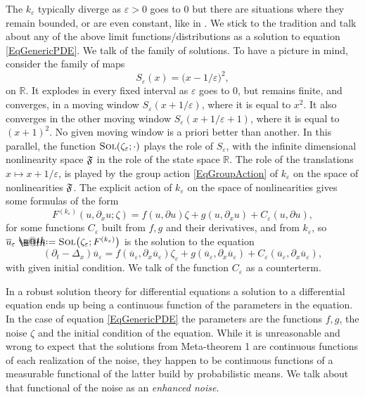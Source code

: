 \documentclass[10pt, reqno]{amsart}
\makeatletter
\numberwithin{subsection}{section}
\numberwithin{subsubsection}{subsection}
\numberwithin{equation}{section} %
\theoremstyle{mystyle}
\theoremstyle{mystyle2}
\theoremstyle{mystyle3}
\newcommand{\ssk}{\smallskip}
\renewcommand{\epsilon}{\varepsilon}
\newcommand\bbR{\mathbb{R}}
\newcommand*{\defeq}{\mathrel{\rlap{%
                     \raisebox{0.3ex}{$\m@th\cdot$}}%
                     \raisebox{-0.3ex}{$\m@th\cdot$}}%
                     =}
\makeatother
\begin{document}
The $k_\epsilon$ typically diverge as $\epsilon>0$ goes to $0$ but there are situations where they remain bounded, or are even constant, like in \cite{BrunedGabrielHairerZambotti}. We stick to the tradition and talk about any of the above limit functions/distributions as a solution to equation \eqref{EqGenericPDE}. We talk of 
the family of solutions. To have a picture in mind, consider the family of maps 
\begin{equation} \label{EqDefnSEpsilon}
S_\epsilon(x) = \big(x-1/\epsilon\big)^2,
\end{equation}
on $\bbR$. It explodes in every fixed interval as $\epsilon$ goes to $0$, 
but remains finite, and converges, in a moving window $S_\epsilon(x+1/\epsilon)$, where it is equal to $x^2$. It also converges in the other moving window $S_\epsilon(x+1/\epsilon+1)$, where it is equal to $(x+1)^2$. No 
given moving window is a priori better than another. In this parallel, the function $\textsc{Sol}(\zeta_\epsilon ; \cdot)$ plays the role of $S_\epsilon$, with the infinite dimensional nonlinearity space $\frak{F}$ in the role of the state space $\bbR$. The role of the translations $x\mapsto 
x+1/\epsilon$, is played by the group action \eqref{EqGroupAction} of $k_\epsilon$ on the space of nonlinearities $\frak{F}$. The explicit action of $k_\epsilon$ on the space of nonlinearities gives some formulas of the form 
$$
F^{(k_\epsilon)}(u,\partial_x u ; \zeta) = f(u,\partial u)\zeta + g(u,\partial_x u) + C_\epsilon(u,\partial u),
$$
for some functions $C_\epsilon$ built from $f,g$ and their derivatives, and from $k_\varepsilon$, so $\overline{u}_\epsilon\defeq\textsc{Sol}\big(\zeta_\epsilon; F^{(k_\epsilon)}\big)$ is the solution to the equation 
\begin{equation} \label{EqrenormalizedPDE}
(\partial_t-\Delta_x)\overline{u}_\epsilon = f(\overline{u}_\epsilon,\partial_x \overline{u}_\epsilon)\zeta_\epsilon + g(\overline{u}_\epsilon,\partial_x \overline{u}_\epsilon) + C_\epsilon(\overline{u}_\epsilon,\partial_x \overline{u}_\epsilon),
\end{equation}
with given initial condition. We talk of the function $C_\epsilon$ as a counterterm.

\ssk

In a robust solution theory for differential equations a solution to a differential equation ends up being a continuous function of the parameters in the equation. In the case of equation \eqref{EqGenericPDE} the parameters are the functions $f,g$, the noise $\zeta$ and the initial condition of the equation. While it is unreasonable and wrong to expect that the solutions from Meta-theorem 1 are continuous functions of each realization of the noise, they happen to be continuous functions of a measurable functional of the latter build by probabilistic means. We talk about that functional of the noise as an {\it enhanced noise}.   
\end{document}

